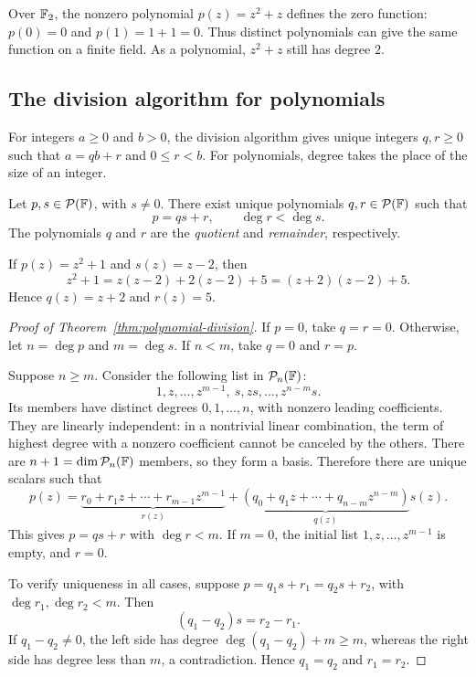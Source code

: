 \begin{example}
  Over $\mathbb{F}_2$, the nonzero polynomial $p(z)=z^2+z$ defines the
  zero function: $p(0)=0$ and $p(1)=1+1=0$. Thus distinct
  polynomials can give the same function on a finite field.
  As a polynomial, $z^2+z$ still has degree $2$.
\end{example}

\subsection{The division algorithm for polynomials}

For integers $a\geq0$ and $b>0$, the division algorithm gives unique
integers $q,r\geq0$ such that $a=qb+r$ and $0\leq r<b$.
For polynomials, degree takes the place of the size of an integer.

\begin{theorem}
  \label{thm:polynomial-division}
  Let $p,s\in\mathcal P(\mathbb{F})$, with $s\neq0$. There exist unique
  polynomials $q,r\in\mathcal P(\mathbb{F})$ such that
  \[
    p=qs+r,\qquad \deg r<\deg s.
  \]
  The polynomials $q$ and $r$ are the \emph{quotient} and
  \emph{remainder}, respectively.
\end{theorem}

\begin{example}
  If $p(z)=z^2+1$ and $s(z)=z-2$, then
  \[
    z^2+1=z(z-2)+2(z-2)+5=(z+2)(z-2)+5.
  \]
  Hence $q(z)=z+2$ and $r(z)=5$.
\end{example}

\begin{proof}[Proof of Theorem~\ref{thm:polynomial-division}]
  If $p=0$, take $q=r=0$. Otherwise, let $n=\deg p$ and
  $m=\deg s$. If $n<m$, take $q=0$ and $r=p$.

  Suppose $n\geq m$. Consider the following list in
  $\mathcal P_n(\mathbb{F})$:
  \[
    1,z,\ldots,z^{m-1},\ s,zs,\ldots,z^{n-m}s.
  \]
  Its members have distinct degrees $0,1,\ldots,n$, with nonzero
  leading coefficients. They are linearly independent: in a
  nontrivial linear combination, the term of highest degree with
  a nonzero coefficient cannot be canceled by the others. There
  are $n+1=\dim\mathcal P_n(\mathbb{F})$ members, so they form a basis.
  Therefore there are unique scalars such that
  \[
    p(z)=\underbrace{r_0+r_1z+\cdots+r_{m-1}z^{m-1}}_{r(z)}
      +\underbrace{(q_0+q_1z+\cdots+q_{n-m}z^{n-m})}_{q(z)}s(z).
  \]
  This gives $p=qs+r$ with $\deg r<m$. If $m=0$, the initial
  list $1,z,\ldots,z^{m-1}$ is empty, and $r=0$.

  To verify uniqueness in all cases, suppose
  $p=q_1s+r_1=q_2s+r_2$, with $\deg r_1,\deg r_2<m$. Then
  \[
    (q_1-q_2)s=r_2-r_1.
  \]
  If $q_1-q_2\neq0$, the left side has degree
  $\deg(q_1-q_2)+m\geq m$, whereas the right side has degree
  less than $m$, a contradiction. Hence $q_1=q_2$ and $r_1=r_2$.
\end{proof}

